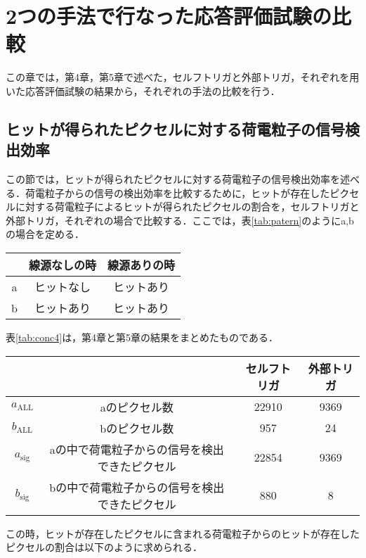 \chapter{2つの手法で行なった応答評価試験の比較}
この章では，第4章，第5章で述べた，セルフトリガと外部トリガ，それぞれを用いた応答評価試験の結果から，それぞれの手法の比較を行う．
\section{ヒットが得られたピクセルに対する荷電粒子の信号検出効率}
この節では，ヒットが得られたピクセルに対する荷電粒子の信号検出効率を述べる．荷電粒子からの信号の検出効率を比較するために，ヒットが存在したピクセルに対する荷電粒子によるヒットが得られたピクセルの割合を，セルフトリガと外部トリガ，それぞれの場合で比較する．ここでは，表\ref{tab:patern}のようにa,bの場合を定める．
\begin{table}[h]
  \centering
  \begin{tabular}{c|cc} \hline
    & 線源なしの時 & 線源ありの時 \\ \hline
    a & ヒットなし & ヒットあり\\
    b & ヒットあり & ヒットあり \\ \hline
  \end{tabular}
\end{table}

表\ref{tab:conc4}は，第4章と第5章の結果をまとめたものである．
\begin{table}[h]
  \centering
  \begin{tabular}{cc|c|c}\hline
    & & セルフトリガ & 外部トリガ \\ \hline
    $a_{\mathrm{ALL}}$ & aのピクセル数 & 22910 & 9369 \\
    $b_{\mathrm{ALL}}$ & bのピクセル数 & 957 & 24 \\
    $a_{\mathrm{sig}}$ & aの中で荷電粒子からの信号を検出できたピクセル & 22854 & 9369 \\
    $b_{\mathrm{sig}}$ & bの中で荷電粒子からの信号を検出できたピクセル & 880 & 8 \\ \hline
  \end{tabular}
\end{table}

この時，ヒットが存在したピクセルに含まれる荷電粒子からのヒットが存在したピクセルの割合は以下のように求められる．

